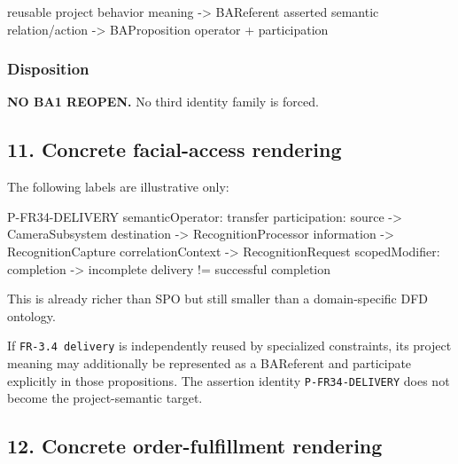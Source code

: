 \documentclass[
  10pt,
  letterpaper,
]{article}
\newenvironment{Shaded}{}{}
\newcommand{\NormalTok}[1]{#1}
\begin{document}
\begin{Shaded}
\begin{Highlighting}[]
\NormalTok{reusable project behavior meaning  {-}\textgreater{} BAReferent}
\NormalTok{asserted semantic relation/action  {-}\textgreater{} BAProposition operator + participation}
\end{Highlighting}
\end{Shaded}

\subsubsection{Disposition}\label{disposition-6}

\textbf{NO BA1 REOPEN.} No third identity family is forced.

\subsection{11. Concrete facial-access
rendering}\label{concrete-facial-access-rendering}

The following labels are illustrative only:

\begin{Shaded}
\begin{Highlighting}[]
\NormalTok{P{-}FR34{-}DELIVERY}
\NormalTok{semanticOperator: transfer}
\NormalTok{participation:}
\NormalTok{  source              {-}\textgreater{} CameraSubsystem}
\NormalTok{  destination         {-}\textgreater{} RecognitionProcessor}
\NormalTok{  information         {-}\textgreater{} RecognitionCapture}
\NormalTok{  correlationContext  {-}\textgreater{} RecognitionRequest}
\NormalTok{scopedModifier:}
\NormalTok{  completion          {-}\textgreater{} incomplete delivery != successful completion}
\end{Highlighting}
\end{Shaded}

This is already richer than SPO but still smaller than a domain-specific
DFD ontology.

If \texttt{FR-3.4\ delivery} is independently reused by specialized
constraints, its project meaning may additionally be represented as a
BAReferent and participate explicitly in those propositions. The
assertion identity \texttt{P-FR34-DELIVERY} does not become the
project-semantic target.

\subsection{12. Concrete order-fulfillment
rendering}\label{concrete-order-fulfillment-rendering}
\end{document}
